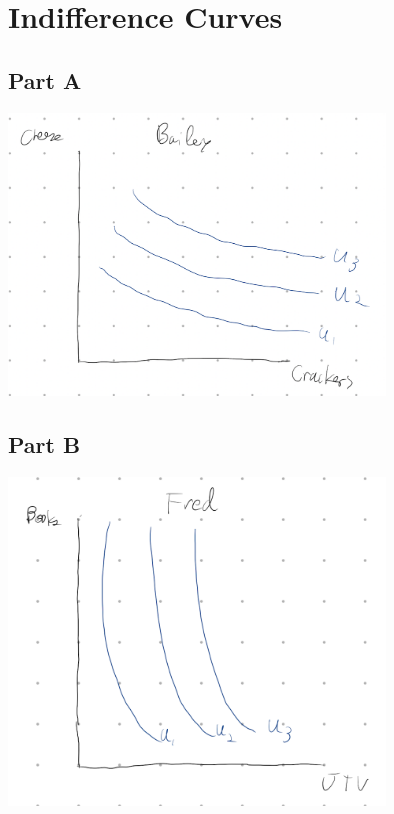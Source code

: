 \documentclass[8pt]{extarticle}
\begin{document}
{\section*{Indifference Curves}
\subsection*{Part A}
\begin{center}
	\includegraphics[width=10cm]{HW2Q12A}
\end{center}
\subsection*{Part B}
\begin{center}
	\includegraphics[width=10cm]{HW2Q12B}
\end{center}
}
\end{document}
